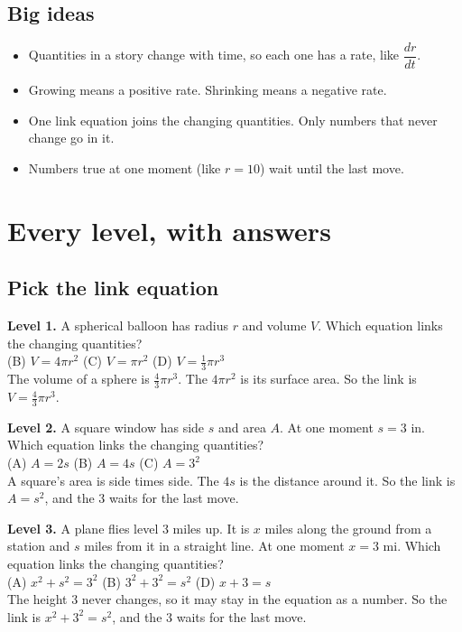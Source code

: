 \documentclass[11pt]{article}
\begin{document}
\subsection*{Big ideas}\begin{itemize}\item Quantities in a story change with time, so each one has a rate, like $\dfrac{dr}{dt}$.
\item Growing means a positive rate. Shrinking means a negative rate.
\item One link equation joins the changing quantities. Only numbers that never change go in it.
\item Numbers true at one moment (like $r=10$) wait until the last move.\end{itemize}
\section*{Every level, with answers}
\subsection*{Pick the link equation}
\noindent\textbf{Level 1.} A spherical balloon has radius $r$ and volume $V$. Which equation links the changing quantities?\\  \quad (B) $V=4\pi r^2$ \quad (C) $V=\pi r^2$ \quad (D) $V=\tfrac13\pi r^3$\\  \quad The volume of a sphere is $\tfrac43\pi r^3$. The $4\pi r^2$ is its surface area. So the link is $V=\tfrac43\pi r^3$.\par\medskip
\noindent\textbf{Level 2.} A square window has side $s$ and area $A$. At one moment $s=3$ in. Which equation links the changing quantities?\\ (A) $A=2s$ \quad (B) $A=4s$ \quad (C) $A=3^2$ \quad {}\\  \quad A square's area is side times side. The $4s$ is the distance around it. So the link is $A=s^2$, and the 3 waits for the last move.\par\medskip
\noindent\textbf{Level 3.} A plane flies level 3 miles up. It is $x$ miles along the ground from a station and $s$ miles from it in a straight line. At one moment $x=3$ mi. Which equation links the changing quantities?\\ (A) $x^2+s^2=3^2$ \quad (B) $3^2+3^2=s^2$ \quad {} \quad (D) $x+3=s$\\  \quad The height 3 never changes, so it may stay in the equation as a number. So the link is $x^2+3^2=s^2$, and the 3 waits for the last move.\par\medskip
\end{document}
